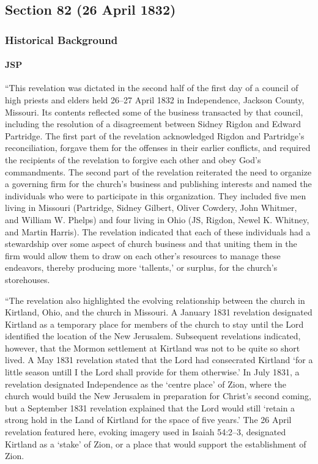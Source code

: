 \subsection{Section 82 (26 April 1832)}
	\label{DC82}
	
	\subsubsection{Historical Background}
		\label{DC82-HB}
		
		\paragraph{JSP}
		
			``This revelation was dictated in the second half of the first day of a council of high priests and elders held 26--27 April 1832 in Independence, Jackson County, Missouri. Its contents reflected some of the business transacted by that council, including the resolution of a disagreement between Sidney Rigdon and Edward Partridge. The first part of the revelation acknowledged Rigdon and Partridge's reconciliation, forgave them for the offenses in their earlier conflicts, and required the recipients of the revelation to forgive each other and obey God's commandments. The second part of the revelation reiterated the need to organize a governing firm for the church's business and publishing interests and named the individuals who were to participate in this organization. They included five men living in Missouri (Partridge, Sidney Gilbert, Oliver Cowdery, John Whitmer, and William W. Phelps) and four living in Ohio (JS, Rigdon, Newel K. Whitney, and Martin Harris). The revelation indicated that each of these individuals had a stewardship over some aspect of church business and that uniting them in the firm would allow them to draw on each other's resources to manage these endeavors, thereby producing more `tallents,' or surplus, for the church's storehouses.
			
			``The revelation also highlighted the evolving relationship between the church in Kirtland, Ohio, and the church in Missouri. A January 1831 revelation designated Kirtland as a temporary place for members of the church to stay until the Lord identified the location of the New Jerusalem. Subsequent revelations indicated, however, that the Mormon settlement at Kirtland was not to be quite so short lived. A May 1831 revelation stated that the Lord had consecrated Kirtland `for a little season untill I the Lord shall provide for them otherwise.' In July 1831, a revelation designated Independence as the `centre place' of Zion, where the church would build the New Jerusalem in preparation for Christ's second coming, but a September 1831 revelation explained that the Lord would still `retain a strong hold in the Land of Kirtland for the space of five years.' The 26 April revelation featured here, evoking imagery used in Isaiah 54:2--3, designated Kirtland as a `stake' of Zion, or a place that would support the establishment of Zion.
			

